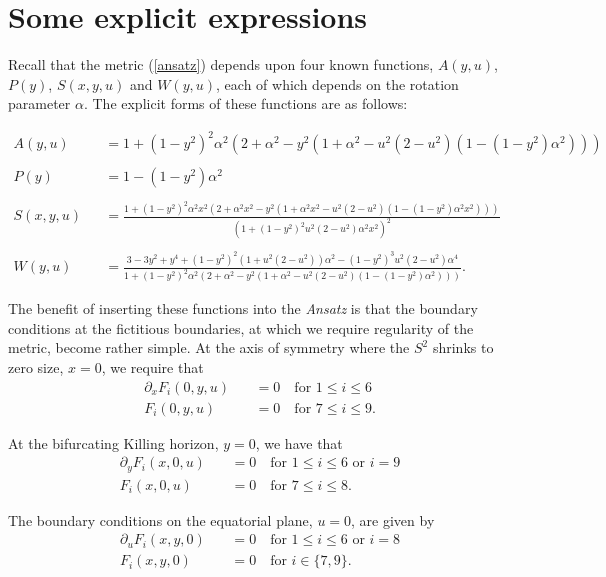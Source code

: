 \documentclass[%
 reprint,
 amsmath,amssymb,
 aps,
]{revtex4-2}
\begin{document}
\section{Some explicit expressions}
Recall that the metric (\ref{ansatz}) depends upon four known functions, $A(y,u)$, $P(y)$, $S(x,y,u)$ and $W(y,u)$, each of which depends on the rotation parameter $\alpha$. The explicit forms of these functions are as follows:
\begin{widetext}

\begin{eqnarray}
    A(y,u)&&=1+(1-y^2)^2\alpha^2(2+\alpha^2-y^2(1+\alpha^2-u^2(2-u^2)(1-(1-y^2)\alpha^2)))  \\ \nonumber\\
    P(y)&&=1-(1-y^2)\alpha^2 \\ \nonumber\\
    S(x,y,u)&&= \frac{1+(1-y^2)^2\alpha^2x^2(2+\alpha^2x^2-y^2(1+\alpha^2x^2-u^2(2-u^2)(1-(1-y^2)\alpha^2x^2)))}{(1+(1-y^2)^2u^2(2-u^2)\alpha^2x^2)^2} \\ \nonumber\\
    W(y,u)&&=\frac{3-3y^2+y^4+(1-y^2)^2(1+u^2(2-u^2))\alpha^2-(1-y^2)^3u^2(2-u^2)\alpha^4}{1+(1-y^2)^2\alpha^2(2+\alpha^2-y^2(1+\alpha^2-u^2(2-u^2)(1-(1-y^2)\alpha^2)))}.
\end{eqnarray}
\end{widetext}
The benefit of inserting these functions into the \emph{Ansatz} is that the boundary conditions at the fictitious boundaries, at which we require regularity of the metric, become rather simple. At the axis of symmetry where the $S^2$ shrinks to zero size, $x=0$, we require that
\begin{eqnarray}
    \partial_x F_i(0,y,u)\, &&=  0 \quad \text{for } 1\leq i \leq 6 \nonumber \\
    F_i(0,y,u)\, &&=  0 \quad \text{for } 7\leq i \leq 9.
\end{eqnarray}

\noindent At the bifurcating Killing horizon, $y=0$, we have that
\begin{eqnarray}
    \partial_y F_i(x,0,u)\, &&=  0 \quad \text{for } 1\leq i \leq 6 \text{ or } i=9 \nonumber \\
    F_i(x,0,u)\, &&=  0 \quad \text{for } 7\leq i \leq 8.
\end{eqnarray}

\noindent The boundary conditions on the equatorial plane, $u=0$, are given by
\begin{eqnarray}
    \partial_u F_i(x,y,0)\, &&=  0 \quad \text{for } 1\leq i \leq 6 \text{ or } i=8 \nonumber \\
    F_i(x,y,0)\, &&=  0 \quad \text{for } i \in \{7,9\}.
\end{eqnarray}
\end{document}

